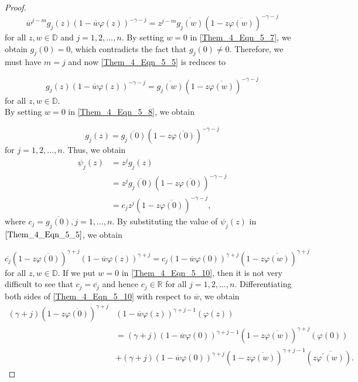 \documentclass[12pt, reqno]{amsart}
\theoremstyle{definition}
\theoremstyle{remark}
\numberwithin{equation}{section}
\begin{document}
\begin{proof}
	\begin{equation}\label{Them_4_Eqn_5_7}
	\overline{w}^{j-m}g_j(z)(1-\overline{w}\varphi(z))^{-\gamma-j}=z^{j-m}\overline{g_j(w)}(1-z\overline{\varphi(w)})^{-\gamma-j}
	\end{equation}
	for all $z,w\in \mathbb{D}$ and $j=1,2, \dots, n$. By setting $w=0$ in \eqref{Them_4_Eqn_5_7}, we obtain $g_j(0)=0$, which contradicts the fact that $g_j(0)\neq 0$. Therefore, we must have $m=j$ and now \eqref{Them_4_Eqn_5_5} is reduces to 
	
	\begin{equation}\label{Them_4_Eqn_5_8}
	g_j(z)(1- \overline{w}\varphi(z))^{-\gamma-j}=\overline{g_j(w)}(1- z\overline{\varphi(w)})^{-\gamma-j}
	\end{equation}
	for all $z,w\in \mathbb{D}$.\\
	
	By setting $w=0$ in \eqref{Them_4_Eqn_5_8}, we obtain
	
	\begin{equation}\label{Them_4_Eqn_5_9}
	g_j(z)=\overline{g_j(0)}(1- z\overline{\varphi(0)})^{-\gamma-j}
	\end{equation}
	for $j=1,2, \dots, n$.	
	Thus, we obtain
	\begin{align*}
	\psi_j(z)&=z^jg_j(z)\\
	&=z^j\overline{g_j(0)}(1-z\overline{\varphi(0)})^{-\gamma-j}\\
	&=c_jz^j(1- z\overline{\varphi(0)})^{-\gamma-j},
	\end{align*}
	where $c_j=\overline{g_j(0)}, j=1, \dots, n$.	
	By substituting the value of $\psi_j(z)$ in $\eqref{Them_4_Eqn_5_5}$, we obtain
	
	\begin{equation}\label{Them_4_Eqn_5_10}
	\overline{c_j}(1- z\overline{\varphi(0)})^{\gamma+j}(1-\overline{ w}\varphi(z))^{\gamma+j}=c_j(1- \overline{w}\varphi(0))^{\gamma+j}(1- z\overline{\varphi(w)})^{\gamma+j}
	\end{equation}
	for all $z,w\in \mathbb{D}$.
	If we put $w=0$ in \eqref{Them_4_Eqn_5_10}, then it is not very difficult to see that $c_j=\overline{c_j}$ and hence $c_j\in \mathbb{R}$ for all $j=1, 2, \dots, n.$
	Differentiating both sides of \eqref{Them_4_Eqn_5_10} with respect to $\overline{w}$, we obtain
	\begin{align}\label{EQ_3.22}
	(\gamma+j)(1- z\overline{\varphi(0)})^{\gamma+j}&(1-\overline{ w}\varphi(z))^{\gamma+j-1}(\varphi(z))\nonumber\\
	&=(\gamma+j)(1-\overline{w}\varphi(0))^{\gamma+j-1}(1- z\overline{\varphi(w)})^{\gamma+j}(\varphi(0))\nonumber\\
	&+(\gamma+j)(1-\overline{w}\varphi(0))^{\gamma+j}(1- z\overline{\varphi(w)})^{\gamma+j-1}(z\overline{\varphi^\prime(w)}).
	\end{align}
	

\end{proof}
\end{document}
